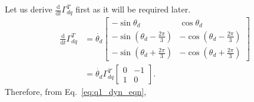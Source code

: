 Let us derive $\frac{\text{d}}{\text{d}t}\Gamma_{dq}^T$ first as it will be required later.
\begin{align*}
\frac{\text{d}}{\text{d}t} \Gamma_{dq}^T &= \dot{\theta_d}\begin{bmatrix}
-\sin \theta_d & \cos \theta_d\\
-\sin (\theta_d-\frac{2\pi}{3}) & -\cos (\theta_d-\frac{2\pi}{3})\\
-\sin (\theta_d+\frac{2\pi}{3}) & -\cos (\theta_d+\frac{2\pi}{3}) 
\end{bmatrix} \\
&= \dot{\theta_d} \Gamma_{dq}^T \begin{bmatrix}
0 & -1\\1 & 0
\end{bmatrix}.
\end{align*}
Therefore, from Eq.~\ref{eq:q1_dyn_eqn},
